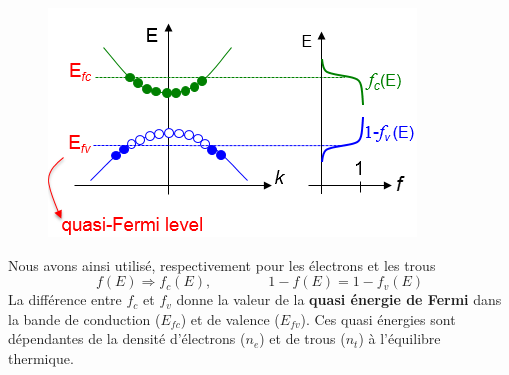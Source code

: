 	\begin{figure}
	\vspace{-5mm}
	\includegraphics[scale=0.5]{ch5/image14}
	\end{figure}
	Nous avons ainsi utilisé, respectivement pour les électrons et les trous
	\begin{equation}
	f(E)\Rightarrow f_c(E),\qquad\qquad 1-f(E) = 1-f_v(E)
	\end{equation}
	La différence entre $f_c$ et $f_v$ donne la valeur de la \textbf{quasi énergie de Fermi} dans 
	la bande de conduction ($E_{fc}$) et de valence ($E_{fv}$). Ces quasi énergies sont dépendantes 
	de la densité d'électrons ($n_e$) et de trous ($n_t$) à l'équilibre thermique.\ \\
	
